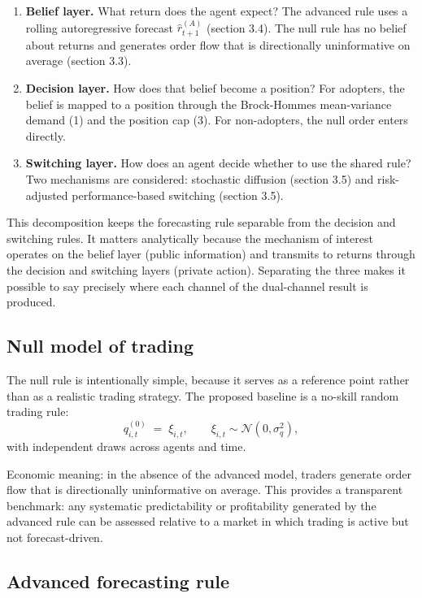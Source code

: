 \documentclass[11pt]{article}
\begin{document}
\begin{enumerate}[itemsep=0.2em]
  \item \textbf{Belief layer.} What return does the agent expect? The advanced rule uses a rolling autoregressive forecast $\hat{r}_{t+1}^{(A)}$ (section 3.4). The null rule has no belief about returns and generates order flow that is directionally uninformative on average (section 3.3).
  \item \textbf{Decision layer.} How does that belief become a position? For adopters, the belief is mapped to a position through the Brock-Hommes mean-variance demand (1) and the position cap (3). For non-adopters, the null order enters directly.
  \item \textbf{Switching layer.} How does an agent decide whether to use the shared rule? Two mechanisms are considered: stochastic diffusion (section 3.5) and risk-adjusted performance-based switching (section 3.5).
\end{enumerate}

This decomposition keeps the forecasting rule separable from the decision and switching rules. It matters analytically because the mechanism of interest operates on the belief layer (public information) and transmits to returns through the decision and switching layers (private action). Separating the three makes it possible to say precisely where each channel of the dual-channel result is produced.

\subsection{Null model of trading}

The null rule is intentionally simple, because it serves as a reference point rather than as a realistic trading strategy. The proposed baseline is a no-skill random trading rule:
\begin{equation}
  q_{i,t}^{(0)} \;=\; \xi_{i,t}, \qquad \xi_{i,t} \sim \mathcal{N}(0, \sigma_{q}^{2}),
\end{equation}
with independent draws across agents and time.

Economic meaning: in the absence of the advanced model, traders generate order flow that is directionally uninformative on average. This provides a transparent benchmark: any systematic predictability or profitability generated by the advanced rule can be assessed relative to a market in which trading is active but not forecast-driven.

\subsection{Advanced forecasting rule}
\end{document}
